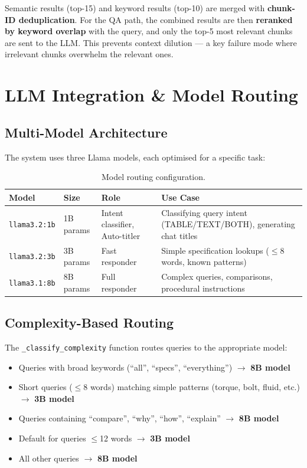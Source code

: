\documentclass[12pt, a4paper]{article}
\begin{document}
Semantic results (top-15) and keyword results (top-10) are merged with \textbf{chunk-ID deduplication}. For the QA path, the combined results are then \textbf{reranked by keyword overlap} with the query, and only the top-5 most relevant chunks are sent to the LLM. This prevents context dilution — a key failure mode where irrelevant chunks overwhelm the relevant ones.

\section{LLM Integration \& Model Routing}

\subsection{Multi-Model Architecture}

The system uses three Llama models, each optimised for a specific task:

\begin{table}[H]
\centering
\caption{Model routing configuration.}
\begin{tabularx}{\textwidth}{l l l X}
\toprule
\textbf{Model} & \textbf{Size} & \textbf{Role} & \textbf{Use Case} \\
\midrule
\texttt{llama3.2:1b} & 1B params & Intent classifier, Auto-titler & Classifying query intent (TABLE/TEXT/BOTH), generating chat titles \\
\texttt{llama3.2:3b} & 3B params & Fast responder & Simple specification lookups ($\leq$8 words, known patterns) \\
\texttt{llama3.1:8b} & 8B params & Full responder & Complex queries, comparisons, procedural instructions \\
\bottomrule
\end{tabularx}
\end{table}

\subsection{Complexity-Based Routing}

The \texttt{\_classify\_complexity} function routes queries to the appropriate model:

\begin{itemize}[itemsep=2pt]
  \item Queries with broad keywords (``all'', ``specs'', ``everything'') $\rightarrow$ \textbf{8B model}
  \item Short queries ($\leq$8 words) matching simple patterns (torque, bolt, fluid, etc.) $\rightarrow$ \textbf{3B model}
  \item Queries containing ``compare'', ``why'', ``how'', ``explain'' $\rightarrow$ \textbf{8B model}
  \item Default for queries $\leq$12 words $\rightarrow$ \textbf{3B model}
  \item All other queries $\rightarrow$ \textbf{8B model}
\end{itemize}
\end{document}
